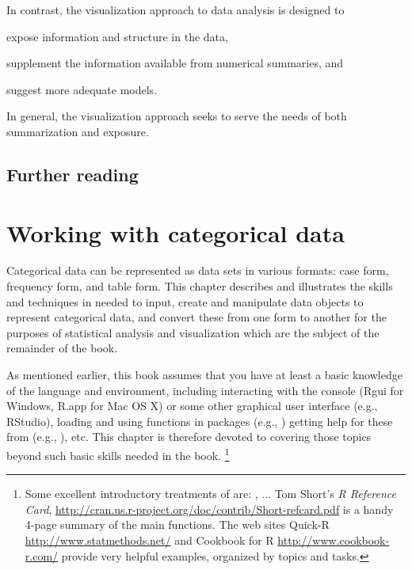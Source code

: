 \documentclass[11pt]{book}\usepackage[]{graphicx}\usepackage[]{color}
\begin{document}
In contrast, the visualization approach to data analysis is designed
to 
\begin{seriate}
\item expose information and structure in the data,
\item supplement the information available from numerical summaries, and 
\item suggest more adequate models.
\end{seriate}
In general, the visualization approach seeks to serve the needs of
both summarization and exposure.

\section{Further reading}\label{sec:ch01-reading}







\chapter{Working with categorical data}\label{ch:working}


Categorical data can be represented as data sets
in various formats:
case form, frequency form, and table form.  This chapter
describes and illustrates the skills and techniques in \R
needed to input, create and manipulate \R data objects
to represent categorical data, and convert these from one
form to another for the purposes of statistical analysis
and visualization which are the subject of the remainder of the book.

As mentioned earlier, this book assumes that you have at least a
basic knowledge of the \R language and environment, including
interacting with the \R console (Rgui for Windows, R.app for Mac OS X)
or some other graphical user interface (e.g., RStudio),
loading and using \R functions in packages (e.g., )
getting help for these from \R (e.g., ), etc.
This chapter is therefore devoted
to covering those topics beyond such basic skills needed in the book.%
\footnote{
Some excellent introductory treatments of \R are:
\citet[]{FoxWeisberg:2011}, ...
Tom Short's \emph{R Reference Card}, \url{http://cran.us.r-project.org/doc/contrib/Short-refcard.pdf} is a handy 4-page summary of the main functions.
The web sites
Quick-R \url{http://www.statmethods.net/} and
Cookbook for R \url{http://www.cookbook-r.com/}
provide very helpful examples, organized by topics and tasks.
}
\end{document}
